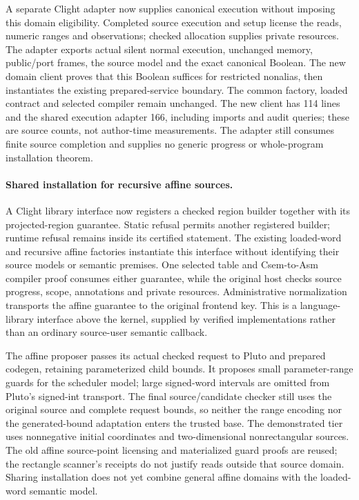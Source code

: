 A separate Clight adapter now supplies canonical execution without imposing
this domain eligibility. Completed source execution and setup license the
reads, numeric ranges and observations; checked allocation supplies private
resources. The adapter exports actual silent normal execution, unchanged
memory, public/port frames, the source model and the exact canonical Boolean.
The new domain client proves that this Boolean suffices for restricted
nonalias, then instantiates the existing prepared-service boundary. The common
factory, loaded contract and selected compiler remain unchanged. The new
client has 114 lines and the shared execution adapter 166, including imports
and audit queries; these are source counts, not author-time measurements.
The adapter still consumes finite source completion and supplies no generic
progress or whole-program installation theorem.

\paragraph{Shared installation for recursive affine sources.}
A Clight library interface now registers a checked region builder together with
its projected-region guarantee. Static refusal permits another registered
builder; runtime refusal remains inside its certified statement. The existing
loaded-word and recursive affine factories instantiate this interface without
identifying their source models or semantic premises. One selected table and
Csem-to-Asm compiler proof consumes either guarantee, while the original host
checks source progress, scope, annotations and private resources. Administrative
normalization transports the affine guarantee to the original frontend key.
This is a language-library interface above the kernel, supplied by verified
implementations rather than an ordinary source-user semantic callback.

The affine proposer passes its actual checked request to Pluto and prepared
codegen, retaining parameterized child bounds. It proposes small parameter-range
guards for the scheduler model; large signed-word intervals are omitted from
Pluto's signed-int transport. The final source/candidate checker still uses the
original source and complete request bounds, so neither the range encoding nor
the generated-bound adaptation enters the trusted base. The demonstrated tier
uses nonnegative initial coordinates and two-dimensional nonrectangular sources.
The old affine source-point licensing and materialized guard proofs are reused;
the rectangle scanner's receipts do not justify reads outside that source domain.
Sharing installation does not yet combine general affine domains with the
loaded-word semantic model.

